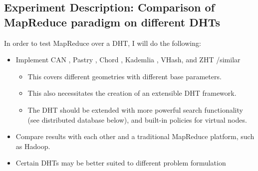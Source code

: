 \subsection{Experiment Description: Comparison of MapReduce paradigm on different DHTs}
In order to test MapReduce over a DHT, I will do the following:
\begin{itemize}
	\item Implement CAN \cite{can}, Pastry \cite{pastry}, Chord \cite{chord}, Kademlia \cite{kademlia}, VHash, and ZHT \cite{li2013zht} /similar
	\begin{itemize}	
		\item This covers different geometries with different base parameters.
		\item This also necessitates the creation of an extensible DHT framework.
		\item  The DHT should be extended with more powerful search functionality (see distributed database below), and built-in policies for virtual nodes.
		
	\end{itemize}
	\item Compare results with each other and a traditional MapReduce platform, such as Hadoop.
	\item Certain DHTs may be better suited to different problem formulation
	
\end{itemize}






